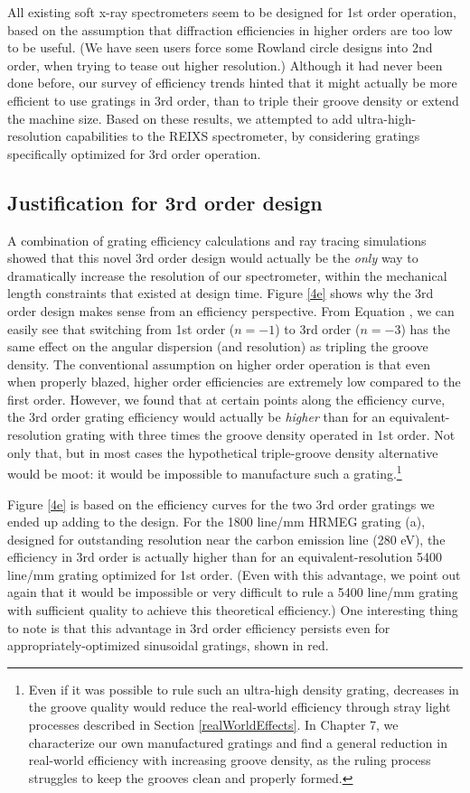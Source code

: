 All existing soft x-ray spectrometers seem to be designed for 1st order operation, based on the assumption that diffraction efficiencies in higher orders are too low to be useful.  (We have seen users force some Rowland circle designs into 2nd order, when trying to tease out higher resolution.)  Although it had never been done before, our survey of efficiency trends hinted that it might actually be more efficient to use gratings in 3rd order, than to triple their groove density or extend the machine size.  Based on these results, we attempted to add ultra-high-resolution capabilities to the REIXS spectrometer, by considering gratings specifically optimized for 3rd order operation.

\subsection{Justification for 3rd order design}
A combination of grating efficiency calculations and ray tracing simulations showed that this novel 3rd order design would actually be the \emph{only} way to dramatically increase the resolution of our spectrometer, within the mechanical length constraints that existed at design time.  Figure \ref{4e} shows why the 3rd order design makes sense from an efficiency perspective.  From Equation , we can easily see that switching from 1st order ($n=-1$) to 3rd order ($n=-3$) has the same effect on the angular dispersion (and resolution) as tripling the groove density.  The conventional assumption on higher order operation is that even when properly blazed, higher order efficiencies are extremely low compared to the first order.  However, we found that at certain points along the efficiency curve, the 3rd order grating efficiency would actually be \emph{higher} than for an equivalent-resolution grating with three times the groove density operated in 1st order.  Not only that, but in most cases the hypothetical triple-groove density alternative would be moot: it would be impossible to manufacture such a grating.\footnote{Even if it was possible to rule such an ultra-high density grating, decreases in the groove quality would reduce the real-world efficiency through stray light processes described in Section \ref{realWorldEffects}.  In Chapter 7, we characterize our own manufactured gratings and find a general reduction in real-world efficiency with increasing groove density, as the ruling process struggles to keep the grooves clean and properly formed.}

Figure \ref{4e} is based on the efficiency curves for the two 3rd order gratings we ended up adding to the design.  For the 1800 line/mm HRMEG grating (a), designed for outstanding resolution near the carbon emission line (280 eV), the efficiency in 3rd order is actually higher than for an equivalent-resolution 5400 line/mm grating optimized for 1st order.  (Even with this advantage, we point out again that it would be impossible or very difficult to rule a 5400 line/mm grating with sufficient quality to achieve this theoretical efficiency.)  One interesting thing to note is that this advantage in 3rd order efficiency persists even for appropriately-optimized sinusoidal gratings, shown in red.

